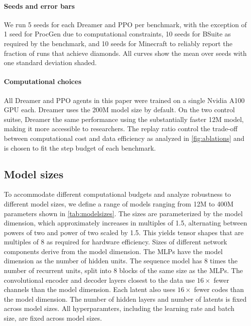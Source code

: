 \paragraph{Seeds and error bars}
We run 5 seeds for each Dreamer and PPO per benchmark, with the exception of 1 seed for ProcGen due to computational constraints, 10 seeds for BSuite as required by the benchmark, and 10 seeds for Minecraft to reliably report the fraction of runs that achieve diamonds. All curves show the mean over seeds with one standard deviation shaded.

\paragraph{Computational choices}
All Dreamer and PPO agents in this paper were trained on a single Nvidia A100 GPU each. Dreamer uses the 200M model size by default. On the two control suitse, Dreamer the same performance using the substantially faster 12M model, making it more accessible to researchers. The replay ratio control the trade-off between computational cost and data efficiency as analyzed in \cref{fig:ablations} and is chosen to fit the step budget of each benchmark.

\clearpage

\subsection*{Model sizes}

To accommodate different computational budgets and analyze robustness to different model sizes, we define a range of models ranging from 12M to 400M parameters shown in \cref{tab:modelsizes}. The sizes are parameterized by the model dimension, which approximately increases in multiples of 1.5, alternating between powers of two and power of two scaled by 1.5. This yields tensor shapes that are multiples of 8 as required for hardware efficiency.
Sizes of different network components derive from the model dimension. The MLPs have the model dimension as the number of hidden units. The sequence model has 8 times the number of recurrent units, split into 8 blocks of the same size as the MLPs. The convolutional encoder and decoder layers closest to the data use $16\times$ fewer channels than the model dimension. Each latent also uses $16\times$ fewer codes than the model dimension. The number of hidden layers and number of latents is fixed across model sizes.
All hyperparamters, including the learning rate and batch size, are fixed across model sizes.

